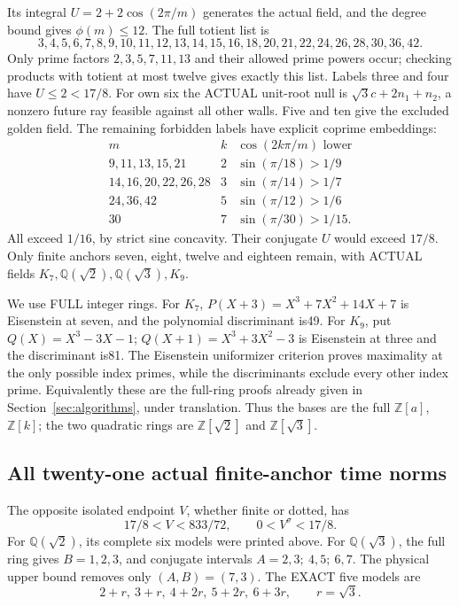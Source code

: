 \documentclass[11pt]{article}
\begin{document}
Its integral \(U=2+2\cos(2\pi/m)\) generates the actual field,
and the degree bound gives \(\phi(m)\le12\).
The full totient list is
\[
 3,4,5,6,7,8,9,10,11,12,13,14,15,16,
 18,20,21,22,24,26,28,30,36,42 .
\]
Only prime factors \(2,3,5,7,11,13\) and their allowed prime
powers occur; checking products with totient at most twelve
gives exactly this list.
Labels three and four have \(U\le2<17/8\).
For own six the ACTUAL unit-root null is
\(\sqrt3c+2n_1+n_2\), a nonzero future ray feasible against
all other walls.
Five and ten give the excluded golden field.
The remaining forbidden labels have explicit coprime embeddings:
\[
\begin{array}{c|c|c}
m&k&\cos(2k\pi/m)\text{ lower}\\ \hline
9,11,13,15,21&2&\sin(\pi/18)>1/9\\
14,16,20,22,26,28&3&\sin(\pi/14)>1/7\\
24,36,42&5&\sin(\pi/12)>1/6\\
30&7&\sin(\pi/30)>1/15 .
\end{array}
\]
All exceed \(1/16\), by strict sine concavity.
Their conjugate \(U\) would exceed \(17/8\).
Only finite anchors seven, eight, twelve and eighteen remain,
with ACTUAL fields \(K_7,\mathbb Q(\sqrt2),\mathbb Q(\sqrt3),K_9\).

We use FULL integer rings.
For \(K_7\), \(P(X+3)=X^3+7X^2+14X+7\) is Eisenstein
at seven, and the polynomial discriminant is49.
For \(K_9\), put \(Q(X)=X^3-3X-1\);
\(Q(X+1)=X^3+3X^2-3\) is Eisenstein at three and the
discriminant is81.
The Eisenstein uniformizer criterion proves maximality at the
only possible index primes, while the discriminants exclude
every other index prime.
Equivalently these are the full-ring proofs already given in
Section~\ref{sec:algorithms}, under translation.
Thus the bases are the full \(\mathbb Z[a]\), \(\mathbb Z[k]\);
the two quadratic rings are \(\mathbb Z[\sqrt2]\) and
\(\mathbb Z[\sqrt3]\).

\subsection{All twenty-one actual finite-anchor time norms}
\label{app:arithA16times}

The opposite isolated endpoint \(V\), whether finite or dotted,
has
\[
                    17/8<V<833/72,\qquad0<V^\sigma<17/8 .
\]
For \(\mathbb Q(\sqrt2)\), its complete six models were printed
above.
For \(\mathbb Q(\sqrt3)\), the full ring gives
\(B=1,2,3\), and conjugate intervals
\(A=2,3;\ 4,5;\ 6,7\).
The physical upper bound removes only \((A,B)=(7,3)\).
The EXACT five models are
\[
                    2+r,\ 3+r,\ 4+2r,\ 5+2r,\ 6+3r,
                    \qquad r=\sqrt3.
\]
\end{document}
